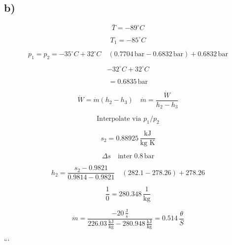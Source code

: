

\subsection*{b)}

\[
\bar{T} = -89^\circ C
\]

\[
T_1 = -85^\circ C
\]

\[
p_1 = p_2 = -35^\circ C + 32^\circ C \quad \left(0.7704 \, \text{bar} - 0.6832 \, \text{bar}\right) + 0.6832 \, \text{bar}
\]

\[
-32^\circ C + 32^\circ C
\]

\[
= 0.6835 \, \text{bar}
\]

\[
\dot{W} = \dot{m} (h_2 - h_3) \quad \dot{m} = \frac{\dot{W}}{h_2 - h_3}
\]

\[
\text{Interpolate via } p_1/p_2
\]

\[
s_2 = 0.88925 \, \frac{\text{kJ}}{\text{kg K}}
\]

\[
\Delta s \quad \text{inter } 0.8 \, \text{bar}
\]

\[
h_2 = \frac{s_2 - 0.9821}{0.9814 - 0.9821} \quad \left(282.1 - 278.26\right) + 278.26
\]

\[
\frac{1}{0} = 280.348 \, \frac{1}{\text{kg}}
\]

\[
\dot{m} = \frac{-20 \, \frac{\text{J}}{\text{s}}}{226.03 \, \frac{\text{kJ}}{\text{kg}} - 280.948 \, \frac{\text{kJ}}{\text{kg}}} = 0.514 \, \frac{\theta}{S}
\]

```